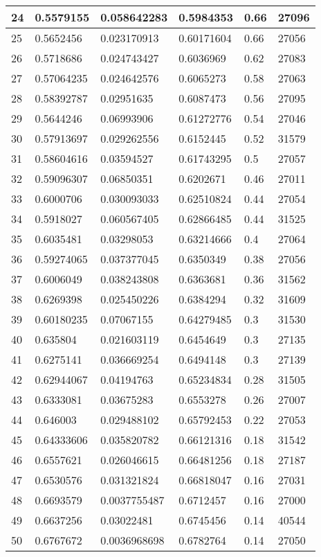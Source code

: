 \begin{longtable}{|l|l|l|l|l|l|}
24 & 0.5579155 & 0.058642283 & 0.5984353 & 0.66 & 27096 \\ \hline 
25 & 0.5652456 & 0.023170913 & 0.60171604 & 0.66 & 27056 \\ \hline 
26 & 0.5718686 & 0.024743427 & 0.6036969 & 0.62 & 27083 \\ \hline 
27 & 0.57064235 & 0.024642576 & 0.6065273 & 0.58 & 27063 \\ \hline 
28 & 0.58392787 & 0.02951635 & 0.6087473 & 0.56 & 27095 \\ \hline 
29 & 0.5644246 & 0.06993906 & 0.61272776 & 0.54 & 27046 \\ \hline 
30 & 0.57913697 & 0.029262556 & 0.6152445 & 0.52 & 31579 \\ \hline 
31 & 0.58604616 & 0.03594527 & 0.61743295 & 0.5 & 27057 \\ \hline 
32 & 0.59096307 & 0.06850351 & 0.6202671 & 0.46 & 27011 \\ \hline 
33 & 0.6000706 & 0.030093033 & 0.62510824 & 0.44 & 27054 \\ \hline 
34 & 0.5918027 & 0.060567405 & 0.62866485 & 0.44 & 31525 \\ \hline 
35 & 0.6035481 & 0.03298053 & 0.63214666 & 0.4 & 27064 \\ \hline 
36 & 0.59274065 & 0.037377045 & 0.6350349 & 0.38 & 27056 \\ \hline 
37 & 0.6006049 & 0.038243808 & 0.6363681 & 0.36 & 31562 \\ \hline 
38 & 0.6269398 & 0.025450226 & 0.6384294 & 0.32 & 31609 \\ \hline 
39 & 0.60180235 & 0.07067155 & 0.64279485 & 0.3 & 31530 \\ \hline 
40 & 0.635804 & 0.021603119 & 0.6454649 & 0.3 & 27135 \\ \hline 
41 & 0.6275141 & 0.036669254 & 0.6494148 & 0.3 & 27139 \\ \hline 
42 & 0.62944067 & 0.04194763 & 0.65234834 & 0.28 & 31505 \\ \hline 
43 & 0.6333081 & 0.03675283 & 0.6553278 & 0.26 & 27007 \\ \hline 
44 & 0.646003 & 0.029488102 & 0.65792453 & 0.22 & 27053 \\ \hline 
45 & 0.64333606 & 0.035820782 & 0.66121316 & 0.18 & 31542 \\ \hline 
46 & 0.6557621 & 0.026046615 & 0.66481256 & 0.18 & 27187 \\ \hline 
47 & 0.6530576 & 0.031321824 & 0.66818047 & 0.16 & 27031 \\ \hline 
48 & 0.6693579 & 0.0037755487 & 0.6712457 & 0.16 & 27000 \\ \hline 
49 & 0.6637256 & 0.03022481 & 0.6745456 & 0.14 & 40544 \\ \hline 
50 & 0.6767672 & 0.0036968698 & 0.6782764 & 0.14 & 27050 \\ \hline 
\end{longtable}